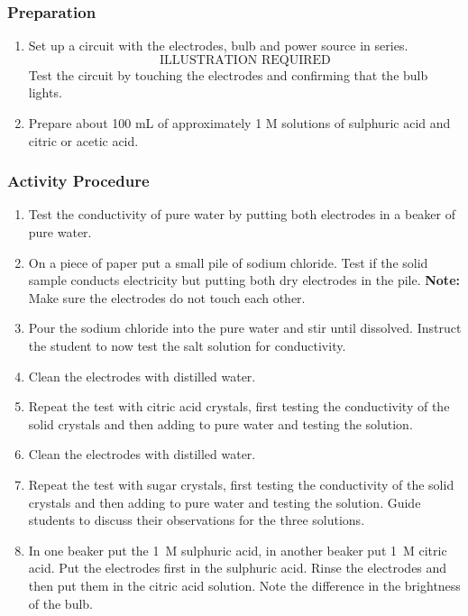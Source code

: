 \subsubsection*{Preparation}
\begin{enumerate}
\item{Set up a circuit with the electrodes, bulb and power source in series. $$\mbox{ILLUSTRATION REQUIRED}$$ Test the circuit by touching the electrodes and confirming that the bulb lights.}
\item{Prepare about 100 mL of approximately 1 M solutions of sulphuric acid and citric or acetic acid.}
\end{enumerate}

\subsubsection*{Activity Procedure}
\begin{enumerate}

\item{Test the conductivity of pure water by putting both electrodes in a beaker of pure water.}
\item{On a piece of paper put a small pile of sodium chloride. Test if the solid sample conducts electricity but putting both dry electrodes in the pile. \textbf{Note:} Make sure the electrodes do not touch each other.}
\item{Pour the sodium chloride into the pure water and stir until dissolved. Instruct the student to now test the salt solution for conductivity.}
\item{Clean the electrodes with distilled water.}
\item{Repeat the test with citric acid crystals, first testing the conductivity of the solid crystals and then adding to pure water and testing the solution.}
\item{Clean the electrodes with distilled water.}
\item{Repeat the test with sugar crystals, first testing the conductivity of the solid crystals and then adding to pure water and testing the solution. Guide students to discuss their observations for the three solutions.}
\item{In one beaker put the 1~M sulphuric acid, in another beaker put 1~M citric acid. Put the electrodes first in the sulphuric acid. Rinse the electrodes and then put them in the citric acid solution. Note the difference in the brightness of the bulb.}
\end{enumerate}

